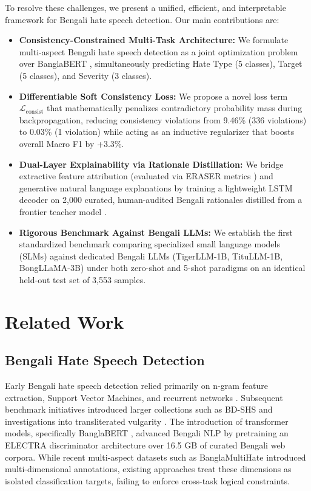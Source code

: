 \documentclass[conference]{IEEEtran}
\begin{document}
To resolve these challenges, we present a unified, efficient, and interpretable framework for Bengali hate speech detection. Our main contributions are:
\begin{itemize}
    \item \textbf{Consistency-Constrained Multi-Task Architecture:} We formulate multi-aspect Bengali hate speech detection as a joint optimization problem over BanglaBERT \cite{bhattacharjee2022banglabert}, simultaneously predicting Hate Type (5 classes), Target (5 classes), and Severity (3 classes).
    \item \textbf{Differentiable Soft Consistency Loss:} We propose a novel loss term $\mathcal{L}_{\text{consist}}$ that mathematically penalizes contradictory probability mass during backpropagation, reducing consistency violations from 9.46\% (336 violations) to 0.03\% (1 violation) while acting as an inductive regularizer that boosts overall Macro F1 by +3.3\%.
    \item \textbf{Dual-Layer Explainability via Rationale Distillation:} We bridge extractive feature attribution (evaluated via ERASER metrics \cite{deyoung2020eraser}) and generative natural language explanations by training a lightweight LSTM decoder on 2,000 curated, human-audited Bengali rationales distilled from a frontier teacher model \cite{team2023gemini}.
    \item \textbf{Rigorous Benchmark Against Bengali LLMs:} We establish the first standardized benchmark comparing specialized small language models (SLMs) against dedicated Bengali LLMs (TigerLLM-1B, TituLLM-1B, BongLLaMA-3B) under both zero-shot and 5-shot paradigms on an identical held-out test set of 3,553 samples.
\end{itemize}

\section{Related Work}
\label{sec:related}

\subsection{Bengali Hate Speech Detection}
Early Bengali hate speech detection relied primarily on n-gram feature extraction, Support Vector Machines, and recurrent networks \cite{romero2019bengali, islam2021bangla}. Subsequent benchmark initiatives introduced larger collections such as BD-SHS \cite{romim2022bdshs} and investigations into transliterated vulgarity \cite{sazzed2021vulgarity}. The introduction of transformer models, specifically BanglaBERT \cite{bhattacharjee2022banglabert}, advanced Bengali NLP by pretraining an ELECTRA discriminator architecture \cite{clark2020electra} over 16.5 GB of curated Bengali web corpora. While recent multi-aspect datasets such as BanglaMultiHate \cite{hasan2026banglamultihate, hasan2023banglamultihate} introduced multi-dimensional annotations, existing approaches treat these dimensions as isolated classification targets, failing to enforce cross-task logical constraints.
\end{document}
